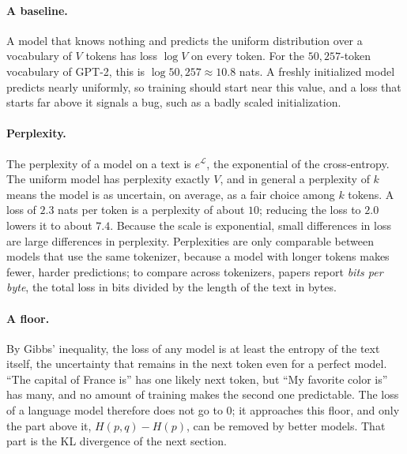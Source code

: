 \paragraph{A baseline.}
A model that knows nothing and predicts the uniform distribution over a
vocabulary of $V$ tokens has loss $\log V$ on every token. For the
$50{,}257$-token vocabulary of GPT-2, this is $\log 50{,}257 \approx
10.8$ nats. A freshly initialized model predicts nearly uniformly, so
training should start near this value, and a loss that starts far above
it signals a bug, such as a badly scaled
initialization.

\paragraph{Perplexity.}
The perplexity of a model on a text is $e^{\mathcal{L}}$, the exponential
of the cross-entropy. The uniform model has perplexity exactly $V$, and
in general a perplexity of $k$ means the model is as uncertain, on
average, as a fair choice among $k$ tokens. A loss of $2.3$ nats per
token is a perplexity of about $10$; reducing the loss to $2.0$ lowers it
to about $7.4$. Because the scale is exponential, small differences in
loss are large differences in perplexity. Perplexities are only
comparable between models that use the same tokenizer, because a model
with longer tokens makes fewer, harder predictions; to compare across
tokenizers, papers report \emph{bits per byte}, the total loss in bits
divided by the length of the text in bytes.

\paragraph{A floor.}
By Gibbs' inequality, the loss of any model is at least the entropy of
the text itself, the uncertainty that remains in the next token even for
a perfect model. ``The capital of France is'' has one likely next token,
but ``My favorite color is'' has many, and no amount of training makes
the second one predictable. The loss of a language model therefore does
not go to $0$; it approaches this floor, and only the part above it,
$H(p, q) - H(p)$, can be removed by better models. That part is the KL
divergence of the next section.

